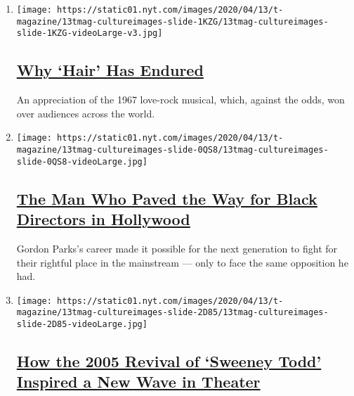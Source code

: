 \begin{enumerate}
\def\labelenumi{\arabic{enumi}.}
\item
  \texttt{[image: https://static01.nyt.com/images/2020/04/13/t-magazine/13tmag-cultureimages-slide-1KZG/13tmag-cultureimages-slide-1KZG-videoLarge-v3.jpg]}

  \hypertarget{why-hair-has-endured}{%
  \subsection{\texorpdfstring{\href{/interactive/2020/04/13/t-magazine/hair-musical-broadway.html}{Why
  `Hair' Has
  Endured}}{Why `Hair' Has Endured}}\label{why-hair-has-endured}}

  An appreciation of the 1967 love-rock musical, which, against the
  odds, won over audiences across the world.
\item
  \texttt{[image: https://static01.nyt.com/images/2020/04/13/t-magazine/13tmag-cultureimages-slide-0QS8/13tmag-cultureimages-slide-0QS8-videoLarge.jpg]}

  \hypertarget{the-man-who-paved-the-way-for-black-directors-in-hollywood}{%
  \subsection{\texorpdfstring{\href{/interactive/2020/04/13/t-magazine/gordon-parks.html}{The
  Man Who Paved the Way for Black Directors in
  Hollywood}}{The Man Who Paved the Way for Black Directors in Hollywood}}\label{the-man-who-paved-the-way-for-black-directors-in-hollywood}}

  Gordon Parks's career made it possible for the next generation to
  fight for their rightful place in the mainstream --- only to face the
  same opposition he had.
\item
  \texttt{[image: https://static01.nyt.com/images/2020/04/13/t-magazine/13tmag-cultureimages-slide-2D85/13tmag-cultureimages-slide-2D85-videoLarge.jpg]}

  \hypertarget{how-the-2005-revival-of-sweeney-todd-inspired-a-new-wave-in-theater}{%
  \subsection{\texorpdfstring{\href{/interactive/2020/04/13/t-magazine/sweeney-todd-revival.html}{How
  the 2005 Revival of `Sweeney Todd' Inspired a New Wave in
  Theater}}{How the 2005 Revival of `Sweeney Todd' Inspired a New Wave in Theater}}\label{how-the-2005-revival-of-sweeney-todd-inspired-a-new-wave-in-theater}}


\end{enumerate}
